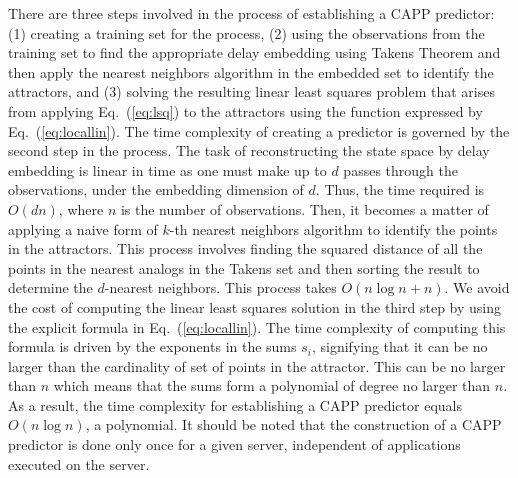 \documentclass[times,10pt,finalversion]{usetex-v1}
\begin{document}
There are three steps involved in the process of establishing a CAPP
predictor: (1) creating a training set for the process, (2) using the
observations from the training set to find the appropriate delay
embedding using Takens Theorem and then apply the nearest neighbors
algorithm in the embedded set to identify the attractors, and (3)
solving the resulting linear least squares problem that arises from
applying Eq.~(\ref{eq:lsq}) to the attractors using the function
expressed by Eq.~(\ref{eq:locallin}). The time complexity of creating a
predictor is governed by the second step in the process.  The task of
reconstructing the state space by delay embedding is linear in time as
one must make up to $d$ passes through the observations, under the
embedding dimension of $d$.  Thus, the time required is $O(dn)$, where
$n$ is the number of observations.  Then, it becomes a matter of
applying a naive form of $k$-th nearest neighbors algorithm to identify
the points in the attractors.  This process involves finding the squared
distance of all the points in the nearest analogs in the Takens set and
then sorting the result to determine the $d$-nearest neighbors.  This process
takes $O(n\log{n}+n)$.  We avoid the cost of computing the linear
least squares solution in the third step by using the explicit formula
in Eq.~(\ref{eq:locallin}). The time complexity of computing this
formula is driven by the exponents in the sums $s_{i}$, signifying that
it can be no
larger than the cardinality of set of points in the attractor.  This can
be no larger than $n$ which means that the sums form a polynomial of
degree no larger than $n$. As a result, the time complexity for
establishing a CAPP predictor equals $O(n\log{n})$, a polynomial.  It
should be noted that the construction of a CAPP predictor is done only once for
a given server, independent of applications executed on the server.
\end{document}
